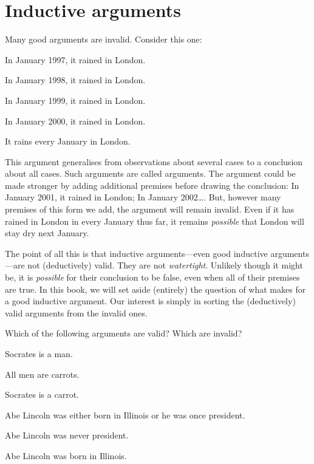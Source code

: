 \section{Inductive arguments}
Many good arguments are invalid. Consider this one:
	\begin{earg}
		\item[] In January 1997, it rained in London.
		\item[] In January 1998, it rained in London.
		\item[] In January 1999, it rained in London.
		\item[] In January 2000, it rained in London.
	\item[\therefore] It rains every January in London.
\end{earg}
This argument generalises from observations about several cases to a conclusion about all cases. Such arguments are called  arguments. The argument could be made stronger by adding additional premises before drawing the conclusion: In January 2001, it rained in London; In January 2002\ldots. But, however many premises of this form we add, the argument will remain invalid. Even if it has rained in London in every January thus far, it remains \emph{possible} that London will stay dry next January.

The point of all this is that inductive arguments---even good inductive arguments---are not (deductively) valid. They are not \emph{watertight}. Unlikely though it might be, it is \emph{possible} for their conclusion to be false, even when all of their premises are true. In this book, we will set aside (entirely) the question of what makes for a good inductive argument. Our interest is simply in sorting the (deductively) valid arguments from the invalid ones.  




\practiceproblems
\problempart
Which of the following arguments are valid? Which are invalid?

\begin{earg}
\item Socrates is a man.
\item All men are carrots.
\item[\therefore] Socrates is a carrot.
\end{earg}

\begin{earg}
\item Abe Lincoln was either born in Illinois or he was once president.
\item Abe Lincoln was never president.
\item[\therefore] Abe Lincoln was born in Illinois.
\end{earg}

